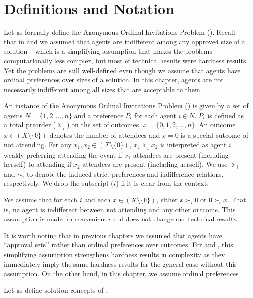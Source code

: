 \section{Definitions and Notation} \label{GT:sec:prelim}

Let us formally define the Anonymous Ordinal Invitations Problem (\AOIP).
Recall that in \GASPs and \SIPs we assumed that agents are indifferent among any approved size of a solution -- which is a simplifying assumption that makes the problems computationally less complex, but most of technical results were hardness results. Yet the problems are still well-defined even though we assume that agents have ordinal preferences over sizes of a solution. In this chapter, agents are not necessarily indifferent among all sizes that are acceptable to them. 

\begin{definition}
An instance of the Anonymous Ordinal Invitations Problem (\AOIP) is given by a set of agents $N = \{1, 2, \dots, n\}$ and a preference $P_i$ for each agent $i\in N$. $P_i$ is defined as a total preorder ($\succeq_i$) on the set of outcomes, $x = \{0, 1, 2, \dots, n\}$. An outcome $x\in (X\setminus\{0\})$ denotes the number of attendees and $x = 0$ is a special outcome of not attending. 
For any $x_1, x_2\in (X \setminus\{0\})$, $x_1 \succeq_i x_2$ is interpreted as agent $i$ weakly preferring attending the event if $x_1$ attendees are present (including herself) to attending if $x_2$ attendees are present (including herself).
We use $\succ_i$ and $\sim_i$ to denote the induced strict preferences and indifference relations, respectively. 
We drop the subscript ($i$) if it is clear from the context.
\end{definition}

We assume that for each $i$ and each $x\in (X\setminus\{0\})$, either $x \succ_i 0$ or $0 \succ_i x$. That is, no agent is indifferent between not attending and any other outcome. This assumption is made for convenience and does not change our technical results. 

It is worth noting that in previous chapters we assumed that agents have ``approval sets'' rather than ordinal preferences over outcomes. For \GASPs and \SIPs, this simplifying assumption strengthens hardness results in complexity as they immediately imply the same hardness results for the general case without this assumption. On the other hand, in this chapter, we assume ordinal preferences 

Let us define solution concepts of \AOIP.

